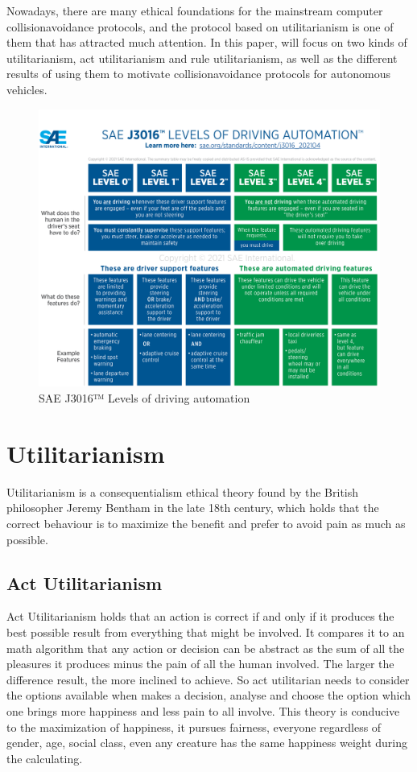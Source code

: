 \documentclass[9pt,twocolumn,twoside,lineno]{gsajnl}
\begin{document}
Nowadays, there are many ethical foundations for the mainstream computer collisionavoidance protocols, and the protocol based on utilitarianism is one of them that has attracted much attention.  In this paper, will focus on two kinds of utilitarianism, act utilitarianism and rule utilitarianism, as well as the different results of using them to motivate collisionavoidance protocols for autonomous vehicles.
\begin{figure}
    \centering
    \includegraphics[width=\linewidth]{j3016graphic_2021.png}
    \caption{SAE J3016™ Levels of driving automation \citep{SAE2021}}
    \label{fig:my_label}
\end{figure}



\section{Utilitarianism}
Utilitarianism is a consequentialism ethical theory found by the British philosopher Jeremy Bentham in the late 18th century, which holds that the correct behaviour is to maximize the benefit and prefer to avoid pain as much as possible. 
\subsection{Act Utilitarianism}
Act Utilitarianism holds that an action is correct if and only if it produces the best possible result from everything that might be involved. It compares it to an math algorithm that any action or decision can be abstract as the sum of all the pleasures it produces minus the pain of all the human involved.   The larger the difference result, the more inclined to achieve.   So act utilitarian needs to consider the options available when makes a decision, analyse and choose the option which one brings more happiness and less pain to all involve.   This theory is conducive to the maximization of happiness, it pursues fairness, everyone regardless of gender, age, social class, even any creature has the same happiness weight during the calculating.
\end{document}
